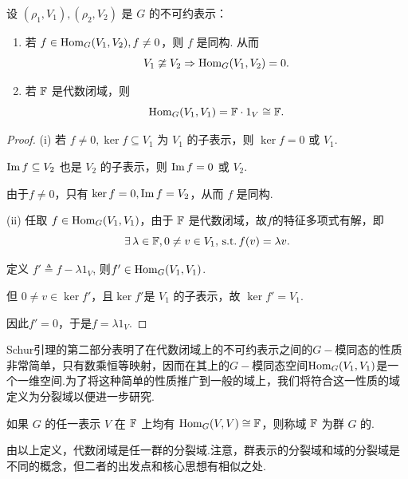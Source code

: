 \begin{lemma}[Schur 引理]
    设 $(\rho_1, V_1), (\rho_2, V_2)$ 是 $G$ 的不可约表示：
    \begin{enumerate}[label=(\roman*)]
        \item 若 $f \in \operatorname{Hom}_G(V_1, V_2), f \neq 0$，则 $f$ 是同构. 从而\begin{equation*}
        V_1 \ncong V_2 \Rightarrow \operatorname{Hom}_G(V_1, V_2) = 0.
        \end{equation*}
        \item 若 $\mathbb{F}$ 是代数闭域，则 
        \begin{equation*}
            \operatorname{Hom}_G(V_1, V_1) = \mathbb{F} \cdot 1_V\cong \mathbb{F}.
        \end{equation*}
    \end{enumerate}
\end{lemma}
\begin{proof}
    (i) 若 $f \neq 0, \ker f \subseteq V_1$ 为 $V_1$ 的子表示，则 $\ker f = 0$ 或 $V_1$.\par
    $\operatorname{Im} f \subseteq V_2$ 也是 $V_2$ 的子表示，则 $\operatorname{Im} f = 0$ 或 $V_2$. \par
    由于$f\neq 0$，只有 $\ker f = 0, \operatorname{Im} f = V_2$，从而 $f$ 是同构.\par
    (ii) 任取 $f \in \operatorname{Hom}_G(V_1, V_1)$，由于 $\mathbb{F}$ 是代数闭域，故$f$的特征多项式有解，即
    \begin{equation*}\exists\, \lambda \in \mathbb{F}, 0 \neq v \in V_1,\operatorname{\,\text{s.t.}} f(v) = \lambda v.
    \end{equation*}

    定义 $f' \triangleq f - \lambda 1_V$, 则$f' \in \operatorname{Hom}_G(V_ 1, V_1)$.\par
    但 $0 \neq v \in \ker f'$，且$\ker f'$是 $V_1$ 的子表示，故 $\ker f' = V_1$.\par
    因此$f' = 0$，于是$f = \lambda 1_V$.
\end{proof}

Schur引理的第二部分表明了在代数闭域上的不可约表示之间的$G-\!\!$模同态的性质非常简单，只有数乘恒等映射，因而在其上的$G-\!\!$模同态空间$\operatorname{Hom}_G(V_1, V_1)$是一个一维空间.为了将这种简单的性质推广到一般的域上，我们将符合这一性质的域定义为分裂域以便进一步研究.

\begin{definition}
    如果 $G$ 的任一表示 $V$ 在 $\mathbb{F}$ 上均有 $\operatorname{Hom}_G(V, V) \cong \mathbb{F}$，则称域 $\mathbb{F}$ 为群 $G$ 的.
\end{definition}
由以上定义，代数闭域是任一群的分裂域.注意，群表示的分裂域和域的分裂域是不同的概念，但二者的出发点和核心思想有相似之处.\par



